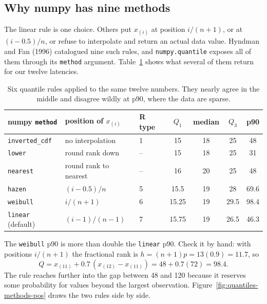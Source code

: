 \subsection{Why numpy has nine methods}

The linear rule is one choice. Others put $x_{(i)}$ at position $i/(n+1)$, or at
$(i - 0.5)/n$, or refuse to interpolate and return an actual data value. Hyndman and
Fan (1996) catalogued nine such rules, and \texttt{numpy.quantile} exposes all of them
through its \texttt{method} argument. Table~\ref{tab:quantiles-methods} shows what
several of them return for our twelve latencies.

\begin{table}[H]
\centering
\begin{tabular}{lllcccc}
\toprule
numpy \texttt{method} & position of $x_{(i)}$ & R type & $Q_1$ & median & $Q_3$ & p90 \\
\midrule
\texttt{inverted\_cdf} & no interpolation & 1 & 15 & 18 & 25 & 48 \\
\texttt{lower} & round rank down & -- & 15 & 18 & 25 & 31 \\
\texttt{nearest} & round rank to nearest & -- & 16 & 20 & 25 & 48 \\
\texttt{hazen} & $(i-0.5)/n$ & 5 & 15.5 & 19 & 28 & 69.6 \\
\texttt{weibull} & $i/(n+1)$ & 6 & 15.25 & 19 & 29.5 & 98.4 \\
\texttt{linear} (default) & $(i-1)/(n-1)$ & 7 & 15.75 & 19 & 26.5 & 46.3 \\
\bottomrule
\end{tabular}
\caption{Six quantile rules applied to the same twelve numbers. They nearly agree in
the middle and disagree wildly at p90, where the data are sparse.}
\label{tab:quantiles-methods}
\end{table}

The \texttt{weibull} p90 is more than double the \texttt{linear} p90. Check it by hand:
with positions $i/(n+1)$ the fractional rank is $h = (n+1)p = 13(0.9) = 11.7$, so
\[
  Q = x_{(11)} + 0.7\,(x_{(12)} - x_{(11)}) = 48 + 0.7(72) = 98.4 .
\] The rule reaches
further into the gap between 48 and 120 because it reserves some probability for
values beyond the largest observation. Figure~\ref{fig:quantiles-methods-pos} draws the two
rules side by side.

